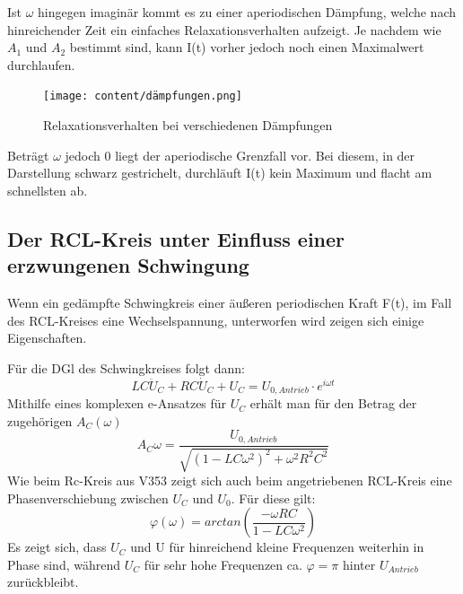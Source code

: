 Ist $\omega$ hingegen imaginär kommt es zu einer
aperiodischen Dämpfung, welche nach hinreichender Zeit  ein einfaches Relaxationsverhalten
 aufzeigt. Je nachdem wie $A_1$ und $A_2$ bestimmt sind, kann I(t) vorher jedoch noch einen
 Maximalwert durchlaufen.

 \begin{figure}[H]
   \centering
   \texttt{[image: content/dämpfungen.png]}
   \caption{Relaxationsverhalten bei verschiedenen Dämpfungen}
   \label{fig:Dämpfungen}
 \end{figure}

 Beträgt $\omega$ jedoch 0 liegt der aperiodische Grenzfall vor. Bei diesem, in der Darstellung schwarz gestrichelt,
  durchläuft I(t) kein Maximum und flacht am schnellsten ab.

\subsection{ Der RCL-Kreis unter Einfluss einer erzwungenen Schwingung}

Wenn ein gedämpfte Schwingkreis einer äußeren periodischen Kraft F(t), im Fall des RCL-Kreises
 eine Wechselspannung, unterworfen wird zeigen sich einige Eigenschaften.

Für die DGl des Schwingkreises folgt dann:
\begin{equation}
  LC \ddot{U}_C + RC \dot{U}_C + U_C = U_{0,Antrieb} \cdot e^{i\omega t}
\end{equation}
Mithilfe eines komplexen e-Ansatzes für $U_C$ erhält man für den Betrag der zugehörigen $A_C(\omega)$
\begin{equation}
  A_C{\omega} = \frac{U_{0,Antrieb}}{\sqrt{(1-LC\omega^2)^2 + \omega^2R^2C^2}}
\end{equation}
\begin{equation}
\end{equation}
Wie beim Rc-Kreis aus V353 zeigt sich auch beim angetriebenen RCL-Kreis eine Phasenverschiebung zwischen $U_C$ und $U_0$.
Für diese gilt:
\begin{equation}
  \varphi(\omega) = arctan\left( \frac{-\omega RC}{1-LC \omega^2}\right)
\end{equation}
Es zeigt sich, dass $U_C$ und U für hinreichend kleine Frequenzen weiterhin in Phase sind,
während $U_C$ für sehr hohe Frequenzen ca. $\varphi = \pi$ hinter $U_{Antrieb}$ zurückbleibt.



